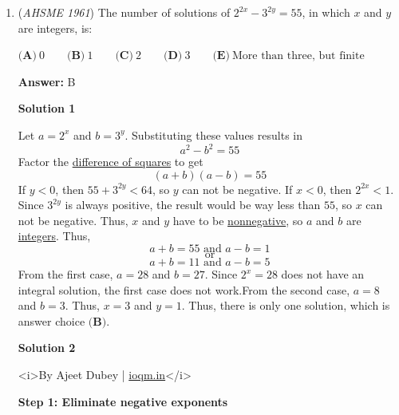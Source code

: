 \begin{enumerate}
 That means each of these angles between the two lines from the center to the two vertices of a side equals $\frac{360}{n}$ degrees.  Thus, the area of the polygon is
 \[n \cdot \frac{1}{2}R^2\sin\left(\frac{360}{n}^{\circ}\right) = 3R^2\]Dividing both sides by $R^2$ yields
 \[\frac{n}{2}\sin\left(\frac{360}{n}^{\circ}\right) = 3\]Multiply both sides by $\frac{2}{n}$ to get
 \[\sin\left(\frac{360}{n}^{\circ}\right) = \frac{6}{n}\]At this point, use trial-and-error for each of the answer choices.  When checking $n = 12$, the equation results in $\sin(30^{\circ}) = \frac{1}{2}$, which is correct.  Thus, the answer is $\boxed{\textbf{(C)}}$.

 


	\item (\textit{AHSME 1961}) The number of solutions of $2^{2x}-3^{2y}=55$, in which $x$ and $y$ are integers, is:


 $\textbf{(A)}\ 0\qquad \textbf{(B)}\ 1\qquad \textbf{(C)}\ 2\qquad \textbf{(D)}\ 3\qquad \textbf{(E)}\ \text{More than three, but finite}$

 \textbf{Answer: }B



\textbf{Solution 1}

Let $a = 2^x$ and $b = 3^y$.  Substituting these values results in
 \[a^2 - b^2 = 55\]Factor the \href{https://artofproblemsolving.com/wiki/index.php?title=Difference\_of\_squares}{difference of squares} to get
 \[(a + b)(a - b) = 55\]If $y < 0$, then $55 + 3^{2y} < 64$, so $y$ can not be negative.  If $x < 0$, then $2^{2x} < 1$.  Since $3^{2y}$ is always positive, the result would be way less than $55$, so $x$ can not be negative.  Thus, $x$ and $y$ have to be \href{https://artofproblemsolving.com/wiki/index.php?title=Nonnegative}{nonnegative}, so $a$ and $b$ are \href{https://artofproblemsolving.com/wiki/index.php?title=Integers}{integers}.  Thus,
 \[a+b=55 \text{ and } a-b=1\]
 \[\text{or}\]
 \[a+b=11 \text{ and } a-b=5\]From the first case, $a = 28$ and $b = 27$.  Since $2^x = 28$ does not have an integral solution, the first case does not work.From the second case, $a = 8$ and $b = 3$.  Thus, $x = 3$ and $y = 1$.  Thus, there is only one solution, which is answer choice $\boxed{\textbf{(B)}}$.

 



\textbf{Solution 2}

<i>By Ajeet Dubey | \href{https://ioqm.in}{ioqm.in}</i>

 \textbf{Step 1: Eliminate negative exponents}


\end{enumerate}
